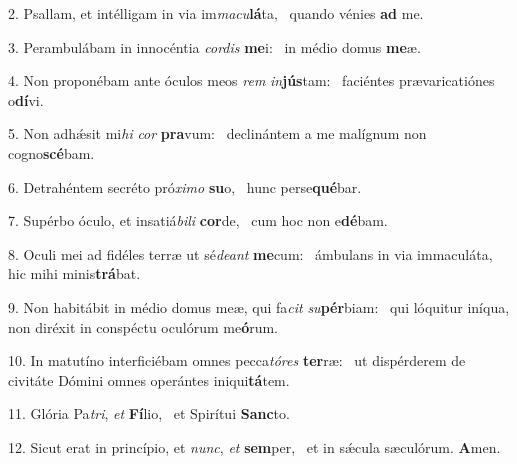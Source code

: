 2. Psallam, et intélligam in via im\textit{ma}\textit{cu}\textbf{lá}ta, \ast\  quando vénies \textbf{ad} me.\

3. Perambulábam in innocéntia \textit{cor}\textit{dis} \textbf{me}i: \ast\  in médio domus \textbf{me}æ.\

4. Non proponébam ante óculos meos \textit{rem} \textit{in}\textbf{jús}tam: \ast\  faciéntes prævaricatiónes o\textbf{dí}vi.\

5. Non adhǽsit mi\textit{hi} \textit{cor} \textbf{pra}vum: \ast\  declinántem a me malígnum non cogno\textbf{scé}bam.\

6. Detrahéntem secréto pró\textit{xi}\textit{mo} \textbf{su}o, \ast\  hunc perse\textbf{qué}bar.\

7. Supérbo óculo, et insatiá\textit{bi}\textit{li} \textbf{cor}de, \ast\  cum hoc non e\textbf{dé}bam.\

8. Oculi mei ad fidéles terræ ut sé\textit{de}\textit{ant} \textbf{me}cum: \ast\  ámbulans in via immaculáta, hic mihi minis\textbf{trá}bat.\

9. Non habitábit in médio domus meæ, qui fa\textit{cit} \textit{su}\textbf{pér}biam: \ast\  qui lóquitur iníqua, non diréxit in conspéctu oculórum me\textbf{ó}rum.\

10. In matutíno interficiébam omnes pecca\textit{tó}\textit{res} \textbf{ter}ræ: \ast\  ut dispérderem de civitáte Dómini omnes operántes iniqui\textbf{tá}tem.\

11. Glória Pa\textit{tri}, \textit{et} \textbf{Fí}lio, \ast\  et Spirítui \textbf{Sanc}to.\

12. Sicut erat in princípio, et \textit{nunc}, \textit{et} \textbf{sem}per, \ast\  et in sǽcula sæculórum. \textbf{A}men.\

